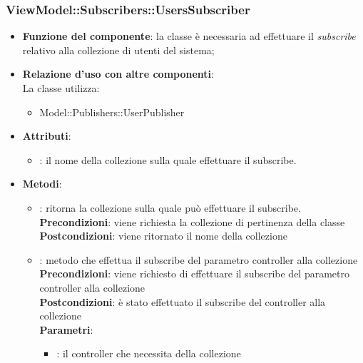 \subsubsection{ViewModel::Subscribers::UsersSubscriber}
\begin{itemize}
\item\textbf{Funzione del componente}: la classe è necessaria ad effettuare il \emph{subscribe} relativo alla collezione di utenti del sistema;
	\item\textbf{Relazione d'uso con altre componenti}: \\
La classe utilizza:
	\begin{itemize}
		\item Model::Publishers::UserPublisher
	\end{itemize}
\item\textbf{Attributi}:
	\begin{itemize}
		\item{}: il nome della collezione sulla quale effettuare il subscribe.\\
	\end{itemize}
\item\textbf{Metodi}:
	\begin{itemize}
		\item{}: ritorna la collezione sulla quale può effettuare il subscribe.\\
		\textbf{Precondizioni}: viene richiesta la collezione di pertinenza della classe\\
		\textbf{Postcondizioni}: viene ritornato il nome della collezione\\
		\item{}: metodo che effettua il subscribe del parametro controller alla collezione\\
		\textbf{Precondizioni}: viene richiesto di effettuare il subscribe del parametro controller alla collezione\\
		\textbf{Postcondizioni}: è stato effettuato il subscribe del controller alla collezione\\
		\textbf{Parametri}:
			\begin{itemize}
				\item{}: il controller che necessita della collezione\\
			\end{itemize}
	\end{itemize}
\end{itemize}

